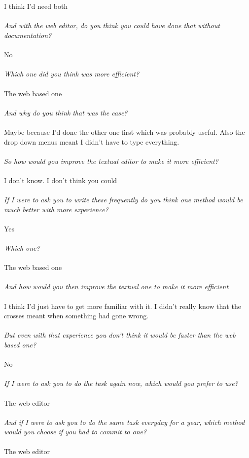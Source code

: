\\
\\
I think I'd need both
\\
\\
\textit{And with the web editor, do you think you could have done that without documentation?}
\\
\\
No
\\
\\
\textit{Which one did you think was more efficient?}
\\
\\
The web based one
\\
\\
\textit{And why do you think that was the case?}
\\
\\
Maybe because I'd done the other one first which was probably useful. Also the drop down menus meant I didn't have to type everything.
\\
\\
\textit{So how would you improve the textual editor to make it more efficient?}
\\
\\
I don't know. I don't think you could
\\
\\
\textit{If I were to ask you to write these frequently do you think one method would be much better with more experience?}
\\
\\
Yes
\\
\\
\textit{Which one?}
\\
\\
The web based one
\\
\\
\textit{And how would you then improve the textual one to make it more efficient}
\\
\\
I think I'd just have to get more familiar with it. I didn't really know that the crosses meant when something had gone wrong.
\\
\\
\textit{But even with that experience you don't think it would be faster than the web based one?}
\\
\\
No
\\
\\
\textit{If I were to ask you to do the task again now, which would you prefer to use?}
\\
\\
The web editor
\\
\\
\textit{And if I were to ask you to do the same task everyday for a year, which method would you choose if you had to commit to one?}
\\
\\
The web editor

%